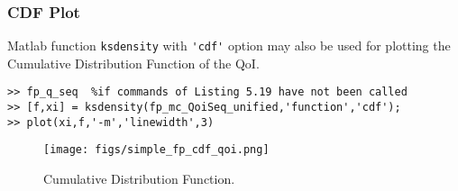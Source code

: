 \subsubsection{CDF Plot}

Matlab function \verb+ksdensity+ with \verb+'cdf'+ option may also be used for plotting the Cumulative Distribution Function of the QoI.

\begin{lstlisting}[label=matlab:fp_cdf_qoi,caption={Matlab code for the QoI CDF plot displayed in Figure \ref{fig:simple_sfp_cdf}.}]
% inside Matlab
>> fp_q_seq  %if commands of Listing 5.19 have not been called
>> [f,xi] = ksdensity(fp_mc_QoiSeq_unified,'function','cdf');
>> plot(xi,f,'-m','linewidth',3)
\end{lstlisting}

\begin{figure}[p]
\centering
\texttt{[image: figs/simple\_fp\_cdf\_qoi.png]}
\vspace*{-10pt}
\caption{Cumulative Distribution Function.}
\label{fig:simple_sfp_cdf}
\end{figure}
